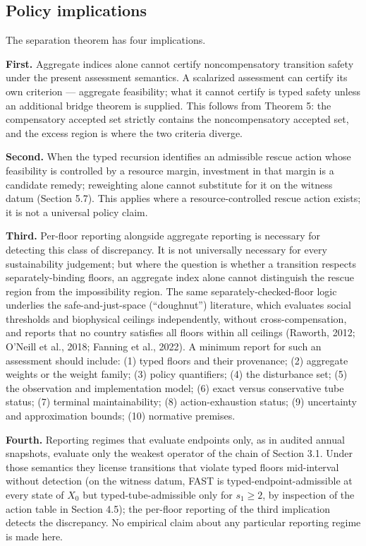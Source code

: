 \documentclass[3p,11pt]{elsarticle}
\begin{document}
\subsection{Policy implications}\label{policy-implications}

The separation theorem has four implications.

\textbf{First.} Aggregate indices alone cannot certify noncompensatory
transition safety under the present assessment semantics. A scalarized
assessment can certify its own criterion --- aggregate feasibility; what
it cannot certify is typed safety unless an additional bridge theorem is
supplied. This follows from Theorem 5: the compensatory accepted set
strictly contains the noncompensatory accepted set, and the excess
region is where the two criteria diverge.

\textbf{Second.} When the typed recursion identifies an admissible
rescue action whose feasibility is controlled by a resource margin,
investment in that margin is a candidate remedy; reweighting alone cannot substitute for it on the witness datum (Section 5.7). This applies where a resource-controlled rescue action exists; it is not a universal policy claim.

\textbf{Third.} Per-floor reporting alongside aggregate reporting is
necessary for detecting this class of discrepancy. It is not universally
necessary for every sustainability judgement; but where the question is
whether a transition respects separately-binding floors, an aggregate
index alone cannot distinguish the rescue region from the impossibility region. The same separately-checked-floor logic underlies the safe-and-just-space (``doughnut'') literature, which evaluates social thresholds and biophysical ceilings independently, without cross-compensation, and reports that no country satisfies all floors within all ceilings (Raworth, 2012; O'Neill et al., 2018; Fanning et al., 2022). A minimum report for such an assessment should include: (1)
typed floors and their provenance; (2) aggregate weights or the weight
family; (3) policy quantifiers; (4) the disturbance set; (5) the
observation and implementation model; (6) exact versus conservative tube
status; (7) terminal maintainability; (8) action-exhaustion status; (9)
uncertainty and approximation bounds; (10) normative premises.

\textbf{Fourth.} Reporting regimes that evaluate endpoints only, as in audited annual snapshots, evaluate only the weakest operator of the chain of Section 3.1. Under those semantics they license transitions that violate typed floors mid-interval without detection (on the witness datum, FAST is typed-endpoint-admissible at every state of \(X_0\) but typed-tube-admissible only for \(s_1 \ge 2\), by inspection of the action table in Section 4.5); the per-floor reporting of the third implication detects the discrepancy. No empirical claim about any particular reporting regime is made here.
\end{document}
